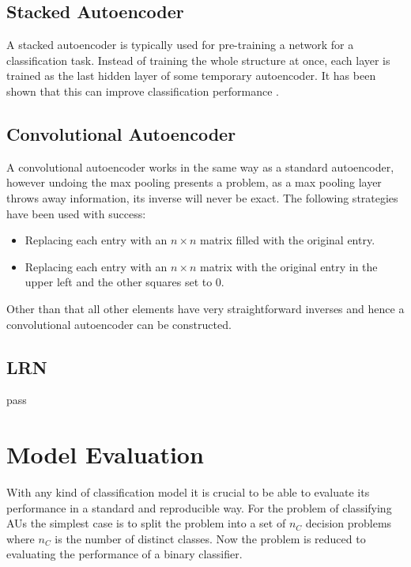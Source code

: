     \subsection{Stacked Autoencoder}
      A stacked autoencoder is typically used for pre-training a network for a classification task.
      Instead of training the whole structure at once, each layer is trained as the last hidden
      layer of some temporary autoencoder. It has been shown that this can improve classification performance \cite{stacks}.
    \subsection{Convolutional Autoencoder}
      A convolutional autoencoder works in the same way as a standard autoencoder, however
      undoing the max pooling presents a problem, as a max pooling layer throws away
      information, its inverse will never be exact. The following strategies have been
      used with success:
      \begin{itemize}
        \item Replacing each entry with an $n \times n$ matrix filled with the original
        entry.
        \item Replacing each entry with an  $n\times n$  matrix with
        the original entry in the upper left and the other squares set to 0. \cite{Dosovitskiy2015}
      \end{itemize}

      Other than that all other elements have very straightforward inverses and hence
      a convolutional autoencoder can be constructed.
    \subsection{LRN}
      pass
  \section{Model Evaluation}
    With any kind of classification model it is crucial to be able to evaluate its
    performance in a standard and reproducible way. For the problem of classifying
    AUs the simplest case is to split the problem into a set of $n_C$ decision problems
    where $n_C$ is the number of distinct classes. Now the problem is reduced to
    evaluating the performance of a binary classifier.


